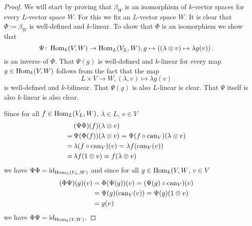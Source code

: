 \begin{proof}
  We will start by proving that $\beta_W$ is an isomorphism of $k$-vector spaces for every $L$-vector space $W$.
  For this we fix an $L$-vector space $W$.
  It is clear that $\Phi \coloneqq \beta_W$ is well-defined and $k$-linear.
  To show that $\Phi$ is an isomorphism we show that
  \[
            \Psi
    \colon  \operatorname{Hom}_k(V,W)
    \to     \operatorname{Hom}_L(V_L, W),
            g
    \mapsto \left(
                      (\lambda \otimes v)
              \mapsto \lambda g(v)
            \right).
  \]
  is an inverse of $\Phi$.
  That $\Psi(g)$ is well-defined and $k$-linear for every map \mbox{$g \in \operatorname{Hom}_k(V,W)$} follows from the fact that the map
  \[
            L \times V
    \to     W,
            (\lambda, v)
    \mapsto \lambda g(v)
  \]
  is well-defined and $k$-bilinear.
  That $\Psi(g)$ is also $L$-linear is clear.
  That $\Psi$ itself is also $k$-linear is also clear.
  
  Since for all $f \in \operatorname{Hom}_L(V_L,W)$, $\lambda \in L$, $v \in V$
  \begin{align*}
     &\,  (\Psi \Phi)(f)(\lambda \otimes v) \\
    =&\,  \Psi(\Phi(f))(\lambda \otimes v)
    =     \Psi(f \circ \operatorname{can}_V)(\lambda \otimes v) \\
    =&\,  \lambda (f \circ \operatorname{can}_V)(v)
    =     \lambda f(\operatorname{can}_V(v)) \\
    =&\,  \lambda f(1 \otimes v)
    =     f (\lambda \otimes v)
  \end{align*}
  we have $\Psi \Phi = \operatorname{id}_{\operatorname{Hom}_L(V_L, W)}$ and since for all $g \in \operatorname{Hom}_k(V,W$, $v \in V$
  \begin{align*}
        (\Phi \Psi)(g)(v)
    &=  \Phi(\Psi(g))(v)
     =  (\Psi(g) \circ \operatorname{can}_V)(v) \\
    &=  \Psi(g)(\operatorname{can}_V(v))
     =  \Psi(g)(1 \otimes v) \\
    &=  g(v)
  \end{align*}
  we have $\Phi \Psi = \operatorname{id}_{\operatorname{Hom}_k(V,W)}$.
  

\end{proof}
